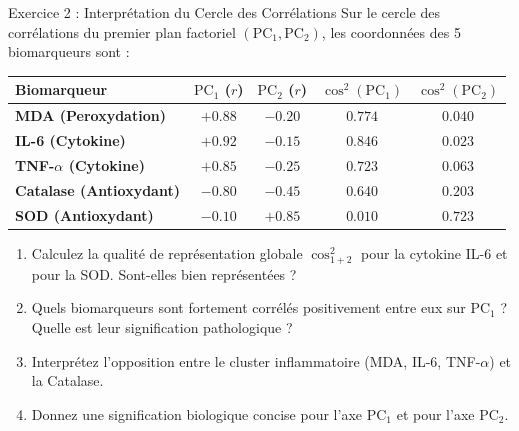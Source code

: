 \documentclass[11pt,a4paper]{article}
\begin{document}
\begin{exercicebox}{Exercice 2 : Interprétation du Cercle des Corrélations}
Sur le cercle des corrélations du premier plan factoriel $(\text{PC}_1, \text{PC}_2)$, les coordonnées des 5 biomarqueurs sont :
\begin{center}
\small
\begin{tabular}{lcccc}
\toprule
\textbf{Biomarqueur} & \textbf{$\text{PC}_1$ ($r$)} & \textbf{$\text{PC}_2$ ($r$)} & \textbf{$\cos^2(\text{PC}_1)$} & \textbf{$\cos^2(\text{PC}_2)$} \\
\midrule
\textbf{MDA (Peroxydation)} & $+0.88$ & $-0.20$ & $0.774$ & $0.040$ \\
\textbf{IL-6 (Cytokine)} & $+0.92$ & $-0.15$ & $0.846$ & $0.023$ \\
\textbf{TNF-$\alpha$ (Cytokine)} & $+0.85$ & $-0.25$ & $0.723$ & $0.063$ \\
\textbf{Catalase (Antioxydant)} & $-0.80$ & $-0.45$ & $0.640$ & $0.203$ \\
\textbf{SOD (Antioxydant)} & $-0.10$ & $+0.85$ & $0.010$ & $0.723$ \\
\bottomrule
\end{tabular}
\end{center}
\begin{enumerate}[label=\textbf{\alph*.}]
  \item Calculez la qualité de représentation globale $\cos^2_{1+2}$ pour la cytokine IL-6 et pour la SOD. Sont-elles bien représentées ?
  \item Quels biomarqueurs sont fortement corrélés positivement entre eux sur $\text{PC}_1$ ? Quelle est leur signification pathologique ?
  \item Interprétez l'opposition entre le cluster inflammatoire (MDA, IL-6, TNF-$\alpha$) et la Catalase.
  \item Donnez une signification biologique concise pour l'axe $\text{PC}_1$ et pour l'axe $\text{PC}_2$.
\end{enumerate}
\end{exercicebox}
\end{document}
